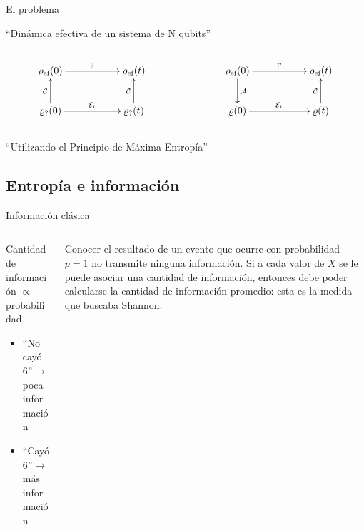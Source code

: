 \begin{frame}{El problema}
    \begin{center}
        ``Dinámica efectiva de un sistema de N qubits''
    \end{center}
    \begin{columns}
        \begin{column}{0.5\textwidth}
            \begin{displaymath}
                \xymatrix{
                  {\rho_{\ef}(0)} \ar[rr]^{\text{?}}
                  && {\rho_{\ef}(t)}\\
                  {\varrho_{\text{?}}(0)} \ar[rr]^{\mcE_{t}} \ar[u]^{\mcC}
                  && {\varrho_{\text{?}}(t)} \ar[u]^{\mcC}
                }
              \end{displaymath}
        \end{column}
        \pause
        \begin{column}{0.5\textwidth}
            \begin{displaymath}
                \xymatrix{
                  {\rho_{\ef}(0)} \ar[rr]^{\Gamma} \ar[d]^{\mcA}
                  && {\rho_{\ef}(t)}\\
                  {\varrho(0)} \ar[rr]^{\mcE_{t}}
                  && {\varrho(t)} \ar[u]^{\mcC}
                }
              \end{displaymath}
              \pause
        \end{column}
    \end{columns}
    \begin{center}
        ``Utilizando el Principio de Máxima Entropía''
    \end{center}
\end{frame}

\subsection{Entropía e información}

\begin{frame}{Información clásica}
    \begin{columns}
        \begin{column}{0.5\textwidth}
            Cantidad de información $\propto$ probabilidad
            \begin{itemize}
                \item ``No cayó 6''$\rightarrow$poca información
                \item ``Cayó 6''$\rightarrow$más información
            \end{itemize}
        \end{column}
        \begin{column}{0.5\textwidth}
            Conocer el resultado de un evento que ocurre con probabilidad $p=1$ no transmite ninguna información. Si a cada valor de $X$ se le puede asociar una cantidad de información, entonces debe poder calcularse la cantidad de información promedio: esta es la medida que buscaba Shannon.
        \end{column}
    \end{columns}
\end{frame}

